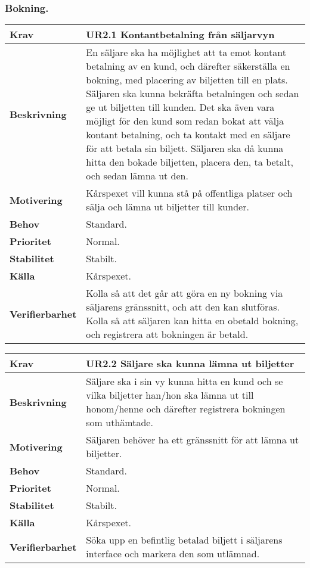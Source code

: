 \documentclass[a4paper, twoside, 11pt, titlepage]{article}
\begin{document}
		\subsubsection{Bokning.}


		\begin{tabular} { p{2.6cm} p{12.5cm} }
			\hline
			\sffamily\textbf{Krav} & \sffamily\textbf{UR2.1 Kontantbetalning från säljarvyn  } \\
			\hline
			\sffamily\textbf{Beskrivning} & En säljare ska ha möjlighet att ta emot kontant betalning av en kund, och därefter säkerställa en bokning, med placering av biljetten till en plats. Säljaren ska kunna bekräfta betalningen och sedan ge ut biljetten till kunden. Det ska även vara möjligt för den kund som redan bokat att välja kontant betalning, och ta kontakt med en säljare för att betala sin biljett. Säljaren ska då kunna hitta den bokade biljetten, placera den, ta betalt, och sedan lämna ut den.  \\
			\hline
			\sffamily\textbf{Motivering} & Kårspexet vill kunna stå på offentliga platser och sälja och lämna ut biljetter till kunder.  \\
			\hline
			\sffamily\textbf{Behov} & Standard.  \\
			\hline
			\sffamily\textbf{Prioritet} & Normal.  \\
			\hline
			\sffamily\textbf{Stabilitet} & Stabilt.  \\
			\hline
			\sffamily\textbf{Källa} & Kårspexet.  \\
			\hline
			\sffamily\textbf{Verifierbarhet} & Kolla så att det går att göra en ny bokning via säljarens gränssnitt, och att den kan slutföras. Kolla så att säljaren kan hitta en obetald bokning, och registrera att bokningen är betald.  \\
			\hline
		\end{tabular}
		\vspace{6mm}

		\begin{tabular} { p{2.6cm} p{12.5cm} }
			\hline
			\sffamily\textbf{Krav} & \sffamily\textbf{UR2.2 Säljare ska kunna lämna ut biljetter  } \\
			\hline
			\sffamily\textbf{Beskrivning} & Säljare ska i sin vy kunna hitta en kund och se vilka biljetter han/hon ska lämna ut till honom/henne och därefter registrera bokningen som uthämtade.  \\
			\hline
			\sffamily\textbf{Motivering} & Säljaren behöver ha ett gränssnitt för att lämna ut biljetter.  \\
			\hline
			\sffamily\textbf{Behov} & Standard.  \\
			\hline
			\sffamily\textbf{Prioritet} & Normal.  \\
			\hline
			\sffamily\textbf{Stabilitet} & Stabilt.  \\
			\hline
			\sffamily\textbf{Källa} & Kårspexet.  \\
			\hline
			\sffamily\textbf{Verifierbarhet} & Söka upp en befintlig betalad biljett i säljarens interface och markera den som utlämnad.  \\
			\hline
		\end{tabular}
		\vspace{6mm}
\end{document}
